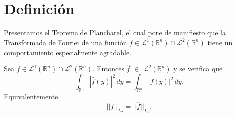 \section{Definición}
Presentamos el Teorema de Plancharel, el cual pone de manifiesto que la Transformada de Fourier de una función $f \in \mathscr{L}^1(\mathbb{R}^n) \cap \mathscr{L}^2(\mathbb{R}^n) $ tiene un comportamiento especialmente agradable.
\begin{lema} \label{teoplanch}
Sea  $f \in \mathscr{L}^1(\mathbb{R}^n) \cap \mathscr{L}^2(\mathbb{R}^n) $. Entonces $\widehat{f}$ $\in$ $\mathscr{L}^2(\mathbb{R}^n)$ y se verifica que
\begin{equation}\label{ecuacion_cons}
    \int_{\mathbb{R}^n} |\widehat{f}(y)|^2 \, dy =  \int_{\mathbb{R}^n} |f(y)|^2 \, dy.
\end{equation}
Equivalentemente,
\begin{equation}
    ||f||_{L_2} =  ||\widehat{f}||_{L_2}.
\end{equation}
\end{lema}

